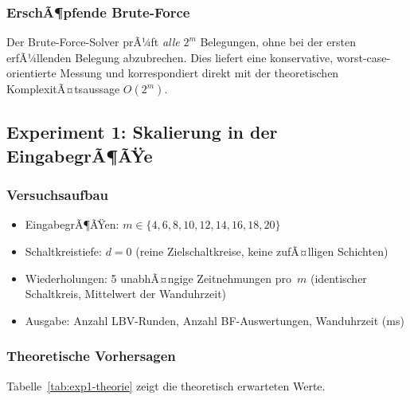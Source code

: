 ﻿\documentclass[a4paper,12pt]{article}
\theoremstyle{definition}
\begin{document}
\subsubsection{ErschÃ¶pfende Brute-Force}

Der Brute-Force-Solver prÃ¼ft \emph{alle} $2^m$ Belegungen, ohne bei der ersten
erfÃ¼llenden Belegung abzubrechen.  Dies liefert eine konservative, worst-case-orientierte
Messung und korrespondiert direkt mit der theoretischen KomplexitÃ¤tsaussage $O(2^m)$.

\subsection{Experiment 1: Skalierung in der EingabegrÃ¶ÃŸe}
\label{subsec:exp1}

\subsubsection{Versuchsaufbau}

\begin{itemize}
  \item EingabegrÃ¶ÃŸen: $m \in \{4, 6, 8, 10, 12, 14, 16, 18, 20\}$
  \item Schaltkreistiefe: $d = 0$ (reine Zielschaltkreise, keine zufÃ¤lligen Schichten)
  \item Wiederholungen: 5 unabhÃ¤ngige Zeitnehmungen pro~$m$ (identischer Schaltkreis,
    Mittelwert der Wanduhrzeit)
  \item Ausgabe: Anzahl LBV-Runden, Anzahl BF-Auswertungen, Wanduhrzeit (ms)
\end{itemize}

\subsubsection{Theoretische Vorhersagen}

Tabelle~\ref{tab:exp1-theorie} zeigt die theoretisch erwarteten Werte.
\end{document}
